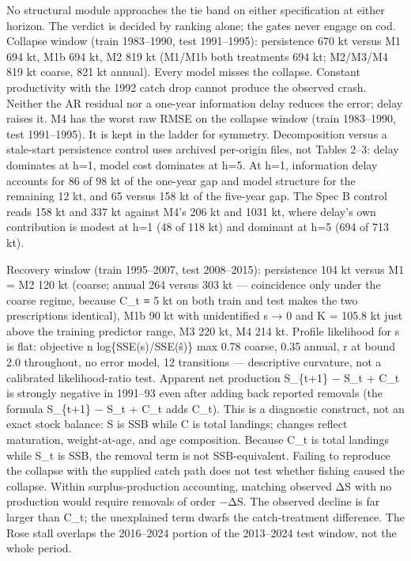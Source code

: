 \documentclass[11pt]{article}
\begin{document}
No structural module approaches the tie band on either specification at
either horizon. The verdict is decided by ranking alone; the gates never
engage on cod. Collapse window (train 1983--1990, test 1991--1995):
persistence 670 kt versus M1 694 kt, M1b 694 kt, M2 819 kt (M1/M1b both
treatments 694 kt; M2/M3/M4 819 kt coarse, 821 kt annual). Every model
misses the collapse. Constant productivity with the 1992 catch drop
cannot produce the observed crash. Neither the AR residual nor a
one-year information delay reduces the error; delay raises it. M4 has
the worst raw RMSE on the collapse window (train 1983--1990, test
1991--1995). It is kept in the ladder for symmetry. Decomposition versus
a stale-start persistence control uses archived per-origin files, not
Tables 2--3: delay dominates at h=1, model cost dominates at h=5. At
h=1, information delay accounts for 86 of 98 kt of the one-year gap and
model structure for the remaining 12 kt, and 65 versus 158 kt of the
five-year gap. The Spec B control reads 158 kt and 337 kt against M4's
206 kt and 1031 kt, where delay's own contribution is modest at h=1 (48
of 118 kt) and dominant at h=5 (694 of 713 kt).

Recovery window (train 1995--2007, test 2008--2015): persistence 104 kt
versus M1 = M2 120 kt (coarse; annual 264 versus 303 kt --- coincidence
only under the coarse regime, because C\_t ≡ 5 kt on both train and test
makes the two prescriptions identical), M1b 90 kt with unidentified s →
0 and K = 105.8 kt just above the training predictor range, M3 220 kt,
M4 214 kt. Profile likelihood for s is flat: objective n
log\{SSE(s)/SSE(ŝ)\} max 0.78 coarse, 0.35 annual, r at bound 2.0
throughout, no error model, 12 transitions --- descriptive curvature,
not a calibrated likelihood-ratio test. Apparent net production
S\_\{t+1\} − S\_t + C\_t is strongly negative in 1991--93 even after
adding back reported removals (the formula S\_\{t+1\} − S\_t + C\_t adds
C\_t). This is a diagnostic construct, not an exact stock balance: S is
SSB while C is total landings; changes reflect maturation,
weight-at-age, and age composition. Because C\_t is total landings while
S\_t is SSB, the removal term is not SSB-equivalent. Failing to
reproduce the collapse with the supplied catch path does not test
whether fishing caused the collapse. Within surplus-production
accounting, matching observed ΔS with no production would require
removals of order −ΔS. The observed decline is far larger than C\_t; the
unexplained term dwarfs the catch-treatment difference. The Rose stall
overlaps the 2016--2024 portion of the 2013--2024 test window, not the
whole period.
\end{document}
